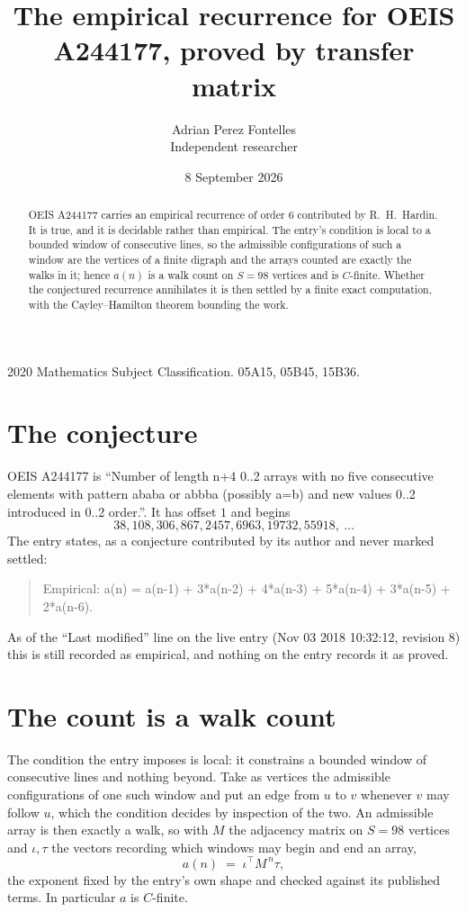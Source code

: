 \documentclass[11pt,a4paper]{article}
\title{The empirical recurrence for OEIS A244177, proved by transfer matrix}
\author{Adrian Perez Fontelles\\ \small Independent researcher}
\date{8 September 2026}
\theoremstyle{plain}
\theoremstyle{definition}
\begin{document}
\maketitle

\begin{abstract}
OEIS A244177 carries an empirical recurrence of order $6$ contributed by R.~H.~Hardin. It is
true, and it is decidable rather than empirical. The entry's condition is local to a bounded window of consecutive lines, so
the admissible configurations of such a window are the vertices of a finite digraph and the
arrays counted are exactly the walks in it; hence $a(n)$ is a walk count on $S=98$ vertices
and is $C$-finite. Whether the conjectured recurrence annihilates it is then settled by a
finite exact computation, with the Cayley--Hamilton theorem bounding the work.
\end{abstract}

\noindent\small 2020 Mathematics Subject Classification. 05A15, 05B45, 15B36.\normalsize

\section{The conjecture}

OEIS A244177 is ``Number of length n+4 0..2 arrays with no five consecutive elements with pattern ababa or abbba (possibly a=b) and new values 0..2 introduced in 0..2 order.''. It has offset $1$ and begins
\[
38, 108, 306, 867, 2457, 6963, 19732, 55918,\ \dots
\]
The entry states, as a conjecture contributed by its author and never marked settled:
\begin{quote}
Empirical: a(n) = a(n-1) + 3*a(n-2) + 4*a(n-3) + 5*a(n-4) + 3*a(n-5) + 2*a(n-6).
\end{quote}
As of the ``Last modified'' line on the live entry (Nov 03 2018 10:32:12, revision 8) this is still
recorded as empirical, and nothing on the entry records it as proved.

\section{The count is a walk count}

The condition the entry imposes is local: it constrains a bounded window of consecutive lines and nothing beyond. Take as
vertices the admissible configurations of one such window and put an edge from $u$ to $v$
whenever $v$ may follow $u$, which the condition decides by inspection of the two. An
admissible array is then exactly a walk, so with $M$ the adjacency matrix on $S=98$ vertices
and $\iota,\tau$ the vectors recording which windows may begin and end an array,
\[
a(n)\;=\;\iota^{\!\top}M^{\,n}\tau ,
\]
the exponent fixed by the entry's own shape and checked against its published terms. In
particular $a$ is $C$-finite.
\end{document}
